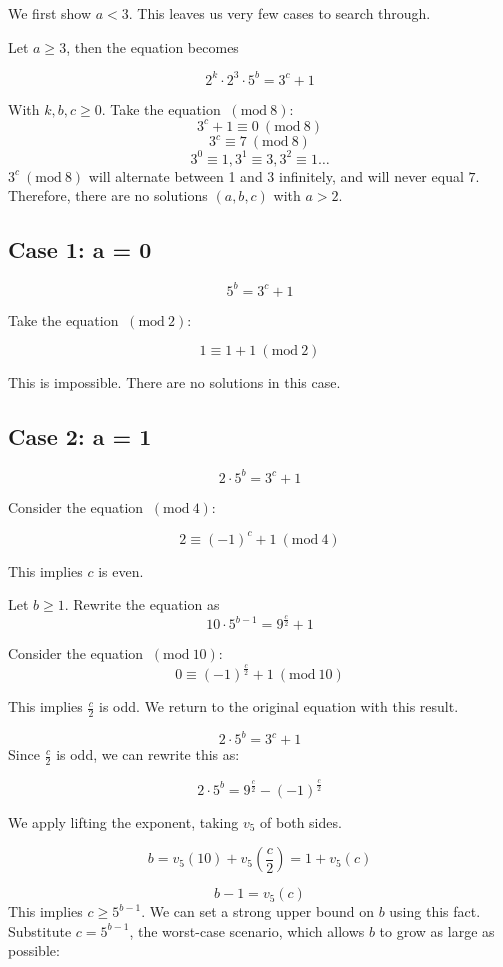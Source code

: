 \documentclass[11pt, letterpaper]{article}
\newcommand{\Mod}[1]{\ (\mathrm{mod}\ #1)}
\begin{document}
\begin{solution}{5}

We first show $a<3$. This leaves us very few cases to search through. 

Let $a\geq3$, then the equation becomes

$$2^{k}\cdot2^3\cdot5^b = 3^c + 1$$

With $k,b,c \geq 0$. Take the equation $\Mod{8}$: $$3^c + 1 \equiv 0 \Mod{8}$$
$$3^c \equiv 7 \Mod{8}$$
$$3^0 \equiv 1, 3^1 \equiv 3, 3^2 \equiv 1 \dotsc$$
$3^c \Mod{8}$ will alternate between 1 and 3 infinitely, and will never equal $7$. Therefore, there are no solutions $(a,b,c)$ with $a>2$. 

\subsection*{Case 1: a = 0}

$$5^b = 3^c + 1$$

Take the equation $\Mod{2}$:

$$1 \equiv 1 + 1 \Mod{2}$$

This is impossible. There are no solutions in this case. 

\subsection*{Case 2: a = 1}

$$2\cdot5^b = 3^c + 1$$

Consider the equation $\Mod{4}$:

$$2 \equiv (-1)^c + 1 \Mod{4}$$

This implies $c$ is even. 

Let $b\geq1$. Rewrite the equation as $$10\cdot5^{b-1} = 9^{\frac{c}{2}} + 1$$

Consider the equation $\Mod{10}$: $$0\equiv (-1)^{\frac{c}{2}} + 1 \Mod{10}$$

This implies $\frac{c}{2}$ is odd. We return to the original equation with this result. 

$$2\cdot5^b = 3^c + 1$$ Since $\frac{c}{2}$ is odd, we can rewrite this as:

$$2\cdot5^{b} = 9^{\frac{c}{2}} - (-1)^{\frac{c}{2}}$$

We apply lifting the exponent, taking $v_5$ of both sides. 

$$b = v_5(10) + v_5(\frac{c}{2}) = 1 + v_5(c)$$

$$b -1= v_5(c)$$ This implies $c\geq 5^{b-1}$. We can set a strong upper bound on $b$ using this fact. Substitute $c= 5^{b-1}$, the worst-case scenario, which allows $b$ to grow as large as possible:


\end{solution}
\end{document}
